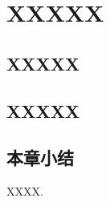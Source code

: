 \newpage
\setcounter{table}{0}
\setcounter{figure}{0}
\section{XXXXX}



\subsection{XXXXX}

\subsection{XXXXX}


\subsection{本章小结}
XXXX.

